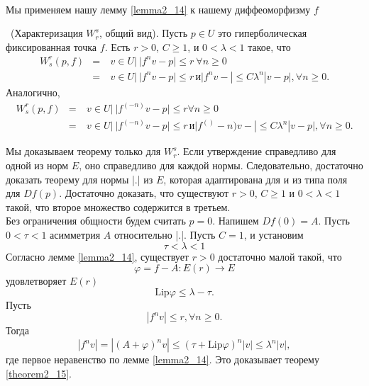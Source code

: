 \\ 
Мы применяем нашу лемму \ref{lemma2_14} к нашему диффеоморфизму $f$
\begin{theorem}
\label{theorem2_15} \ (Характеризация $W_r^s$, общий вид). Пусть $p \in U$ это гиперболическая фиксированная точка $f$. Есть $r > 0$, $C \geq 1$, и $0 < \lambda < 1$ такое, что
$$
\begin{array}{rclll}
W_s^r(p,f) & = & \ {v \in U | \ |f^n v - p| \leq r \ \forall n \geq 0 } \\
                   & = & \ {v \in U | \ |f^n v - p| \leq r \, и |f^n v - | \leq C \lambda^n|v - p|, \forall n \geq 0}.
\end{array} 
$$
Аналогично,
$$
\begin{array}{rclll}
W_s^r(p,f)         & = & \ {v \in U | \ |f^(-n) v - p| \leq r  \forall n \geq 0} \\
                   & = & \ {v \in U | \ |f^(-n) v - p| \leq r \, и |f^()-n) v - | \leq C \lambda^n|v - p|, \forall n \geq 0}.
\end{array} 
$$
\end{theorem}
\begin{demo}
Мы доказываем теорему только для $W_r^s$. Если утверждение справедливо для одной из норм $E$, оно справедливо для каждой нормы. Следовательно, достаточно доказать теорему для нормы |.| из $E$, которая адаптирована для и из типа поля для $Df(p)$. Достаточно доказать, что существуют $r > 0$, $C \geq 1$ и $ 0 < \lambda < 1$ такой, что второе множество содержится в третьем.
\\ Без ограничения общности будем считать $p = 0$. Напишем $Df(0) = A$. Пусть $0 < \tau < 1$ асимметрия $A$ относительно |.|. Пусть $C = 1$, и установим
$$
\tau < \lambda < 1
$$
Согласно лемме \ref{lemma2_14}, существует $r >0$ достаточно малой такой, что 
$$
\varphi = f - A : E(r) \to E
$$
удовлетворяет $E(r)$
$$
 \mathrm{Lip} \varphi \leq \lambda - \tau.
$$
Пусть
$$
|f^n v| \leq r, \forall n \geq 0.
$$
Тогда
$$
|f^n v| = |(A + \varphi)^n v| \leq (\tau +  \mathrm{Lip} \varphi)^n |v| \leq \lambda^n |v|,
$$
где первое неравенство по лемме \ref{lemma2_14}. Это доказывает теорему \ref{theorem2_15}.
\end{demo}

